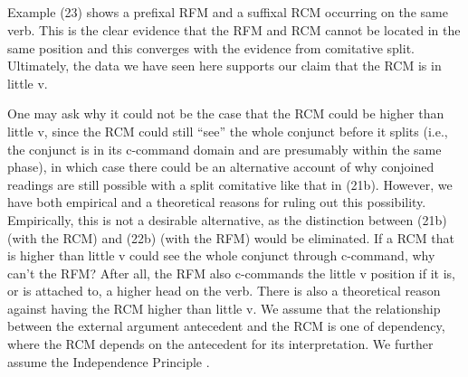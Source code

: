 \begin{listWWviiiNumxlileveli}
\item \ea\label{ex:}
\\
\ea\label{ex:}
\\
\ea\label{ex:}
\\
\ea\label{ex:}
\\
\end{listWWviiiNumxlileveli}

Example (23) shows a prefixal RFM and a suffixal RCM occurring on the same verb. This is the clear evidence that the RFM and RCM cannot be located in the same position and this converges with the evidence from comitative split. Ultimately, the data we have seen here supports our claim that the RCM is in little v. 

  One may ask why it could not be the case that the RCM could be higher than little v, since the RCM could still “see” the whole conjunct before it splits (i.e., the conjunct is in its c-command domain and are presumably within the same phase), in which case there could be an alternative account of why conjoined readings are still possible with a split comitative like that in (21b). However, we have both empirical and a theoretical reasons for ruling out this possibility. Empirically, this is not a desirable alternative, as the distinction between (21b) (with the RCM) and (22b) (with the RFM) would be eliminated. If a RCM that is higher than little v could see the whole conjunct through c-command, why can't the RFM? After all, the RFM also c-commands the little v position if it is, or is attached to, a higher head on the verb. There is also a theoretical reason against having the RCM higher than little v. We assume that the relationship between the external argument antecedent and the RCM is one of dependency, where the RCM depends on the antecedent for its interpretation. We further assume the Independence Principle \citep{Safir2004}. 

\begin{listWWviiiNumxlileveli}
\item \ea\label{ex:}
\\
\end{listWWviiiNumxlileveli}

